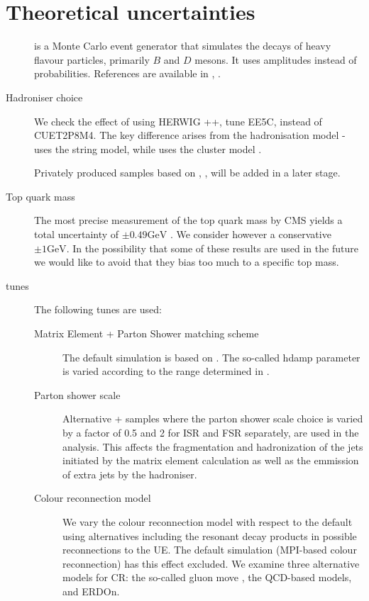 \section{Theoretical uncertainties}
\begin{description}
\item[\EVTGEN] \EVTGEN is a Monte Carlo event generator that simulates the decays of heavy flavour particles, primarily $B$ and $D$ mesons. It uses amplitudes instead of probabilities. References are available in \cite{evtgen}, \cite{Lange:2001uf}.

\item[Hadroniser choice] We check the effect of using HERWIG ++\cite{Bahr:2008pv}, tune EE5C\cite{Seymour:2013qka}, instead of  CUET2P8M4. The key difference arises from the hadronisation model - \PYTHIA uses the string model, while \HERWIGpp uses the cluster model \cite{Sjostrand:hadronisation}. 

  Privately produced samples based on \SHERPA \cite{Gleisberg:2008ta}, \DIRE \cite{Hoche:2015sya},  \cite{Bellm:2015jjp} will be added in a later stage.

\item[Top quark mass] The most precise measurement of the top quark mass by CMS yields a total uncertainty of $\pm 0.49 \text{GeV}$ \cite{Khachatryan:2015hba}. We consider however a conservative $\pm 1 \text{GeV}$. In the possibility that some of these results are used in the future we would like to avoid that they bias too much to a specific top mass.

\item[\PYTHIA tunes] The following \PYTHIA tunes are used:
  
  \begin{description}
    
  \item[Matrix Element + Parton Shower matching scheme] The default simulation is based on \POWHEG. The so-called hdamp parameter is varied according to the range determined in \cite{CMS-PAS-TOP-13-007}.

  \item[Parton shower scale] Alternative \POWHEG +  samples where the parton shower scale choice is varied by a factor of 0.5 and 2 for ISR and FSR separately, are used in the analysis. This affects the fragmentation and hadronization of the jets initiated by the matrix element calculation as well as the emmission of extra jets by the hadroniser.

  \item[Colour reconnection model] We vary the colour reconnection model with respect to the default using alternatives including the resonant decay products in possible reconnections to the UE. The default simulation (MPI-based colour reconnection) has this effect excluded. We examine three alternative models for CR: the so-called gluon move \cite{Argyropoulos:2014zoa}, the QCD-based models\cite{Christiansen:2015yqa}, and ERDOn. 


\end{description}
\end{description}

